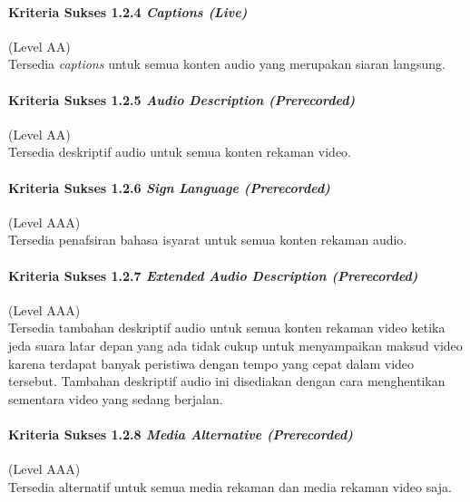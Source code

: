 \paragraph{Kriteria Sukses 1.2.4 \textit{Captions (Live)}}
\label{sec:kriteria_sukses_1.2.4}
(Level AA)\\

Tersedia \textit{captions} untuk semua konten audio yang merupakan siaran langsung.

\paragraph{Kriteria Sukses 1.2.5 \textit{Audio Description (Prerecorded)}}
\label{sec:kriteria_sukses_1.2.5}
(Level AA)\\

Tersedia deskriptif audio untuk semua konten rekaman video.

\paragraph{Kriteria Sukses 1.2.6 \textit{Sign Language (Prerecorded)}}
\label{sec:kriteria_sukses_1.2.6}
(Level AAA)\\

Tersedia penafsiran bahasa isyarat untuk semua konten rekaman audio. 

\paragraph{Kriteria Sukses 1.2.7 \textit{Extended Audio Description (Prerecorded)}}
\label{sec:kriteria_sukses_1.2.7}
(Level AAA)\\

Tersedia tambahan deskriptif audio untuk semua konten rekaman video ketika jeda suara latar depan yang ada tidak cukup untuk menyampaikan maksud video karena terdapat banyak peristiwa dengan tempo yang cepat dalam video tersebut. Tambahan deskriptif audio ini disediakan dengan cara menghentikan sementara video yang sedang berjalan.

\paragraph{Kriteria Sukses 1.2.8 \textit{Media Alternative (Prerecorded)}}
\label{sec:kriteria_sukses_1.2.8}
(Level AAA)\\

Tersedia alternatif untuk semua media rekaman dan media rekaman video saja.

